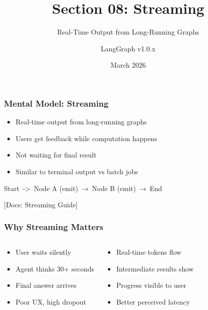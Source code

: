 \documentclass[aspectratio=169,11pt]{beamer}
\title{Section 08: Streaming}
\subtitle{Real-Time Output from Long-Running Graphs}
\author{LangGraph v1.0.x}
\date{March 2026}
\newcommand{\docref}[1]{{\scriptsize\color{docgray}[Docs: #1]}}
\begin{document}
\frame{\titlepage}

\begin{frame}
\frametitle{Mental Model: Streaming}
\begin{conceptbox}
\setlength{\itemsep}{1pt}
\begin{itemize}
\item Real-time output from long-running graphs
\item Users get feedback while computation happens
\item Not waiting for final result
\item Similar to terminal output vs batch jobs
\end{itemize}
\end{conceptbox}
\vspace{0.1cm}
\begin{tipbox}[Flow]
Start \,->\, Node A (emit) \,→\, Node B (emit) \,→\, End
\end{tipbox}
\docref{Streaming Guide}
\end{frame}

\begin{frame}
\frametitle{Why Streaming Matters}
\begin{columns}[T]
\begin{warningbox}
\setlength{\itemsep}{1pt}
\begin{itemize}
\item User waits silently
\item Agent thinks 30+ seconds
\item Final answer arrives
\item Poor UX, high dropout
\end{itemize}
\end{warningbox}
\begin{tipbox}
\setlength{\itemsep}{1pt}
\begin{itemize}
\item Real-time tokens flow
\item Intermediate results show
\item Progress visible to user
\item Better perceived latency
\end{itemize}
\end{tipbox}
\end{columns}
\end{frame}
\end{document}
